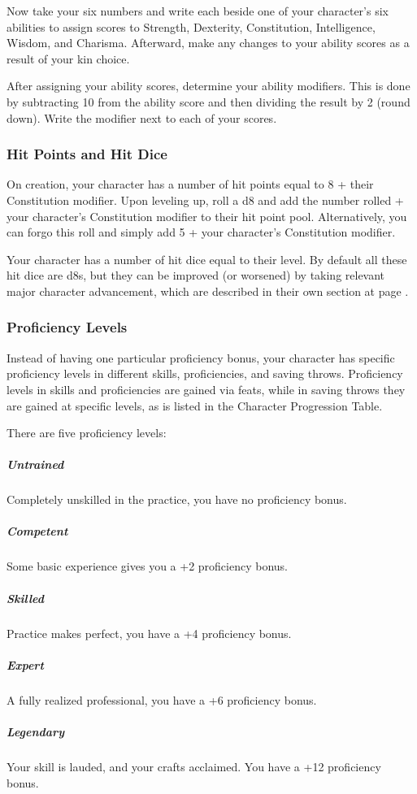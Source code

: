         Now take your six numbers and write each beside one of your character's six abilities to assign scores to Strength, Dexterity, Constitution, Intelligence, Wisdom, and Charisma.
        Afterward, make any changes to your ability scores as a result of your kin choice.

        After assigning your ability scores, determine your ability modifiers.
        This is done by subtracting 10 from the ability score and then dividing the result by 2 (round down).
        Write the modifier next to each of your scores.

    \subsubsection{Hit Points and Hit Dice}
        On creation, your character has a number of hit points equal to 8 + their Constitution modifier.
        Upon leveling up, roll a d8 and add the number rolled + your character's Constitution modifier to their hit point pool.
        Alternatively, you can forgo this roll and simply add 5 + your character's Constitution modifier.

        Your character has a number of hit dice equal to their level.
        By default all these hit dice are d8s, but they can be improved (or worsened) by taking relevant major character advancement, which are described in their own section at page \pageref{ssec::majorcharacteradvancement}.

    \subsubsection{Proficiency Levels}
        Instead of having one particular proficiency bonus, your character has specific proficiency levels in different skills, proficiencies, and saving throws.
        Proficiency levels in skills and proficiencies are gained via feats, while in saving throws they are gained at specific levels, as is listed in the Character Progression Table.

        There are five proficiency levels:
        \subparagraph{Untrained} Completely unskilled in the practice, you have no proficiency bonus.
        \subparagraph{Competent} Some basic experience gives you a +2 proficiency bonus.
        \subparagraph{Skilled} Practice makes perfect, you have a +4 proficiency bonus.
        \subparagraph{Expert} A fully realized professional, you have a +6 proficiency bonus.
        \subparagraph{Legendary} Your skill is lauded, and your crafts acclaimed.
        You have a +12 proficiency bonus.

